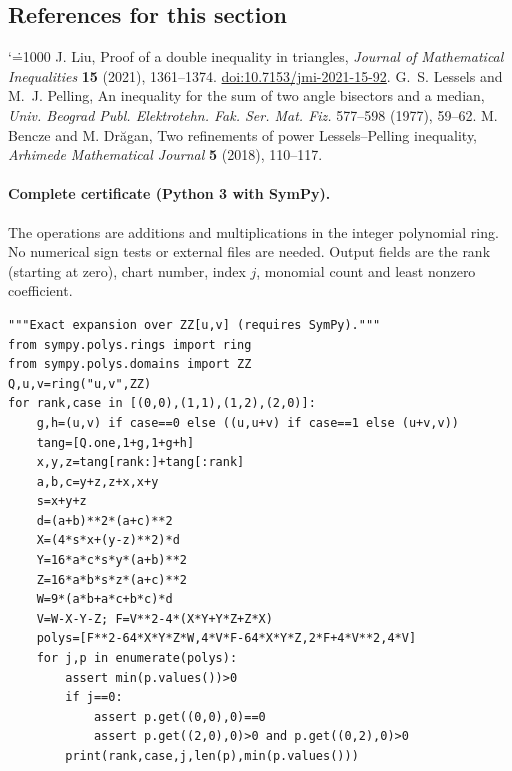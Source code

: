\documentclass[11pt,a4paper]{article}
\makeatletter
\numberwithin{equation}{section}
\theoremstyle{definition}
\theoremstyle{remark}
\renewenvironment{thebibliography}[1]
 {\subsection*{References for this section}\small
  \list{\@biblabel{\@arabic\c@enumiv}}
       {\settowidth\labelwidth{\@biblabel{#1}}\leftmargin\labelwidth
        \advance\leftmargin\labelsep\@openbib@code
        \usecounter{enumiv}\let\p@enumiv\@empty
        \renewcommand\theenumiv{\@arabic\c@enumiv}}
  \sloppy\clubpenalty4000\widowpenalty4000\sfcode`\.=1000\relax}
 {\def\@noitemerr{\@latex@warning{Empty bibliography}}\endlist}
\makeatother
\begin{document}
\begin{thebibliography}{9}
 J. Liu, Proof of a double inequality in triangles, \emph{Journal of Mathematical Inequalities} \textbf{15} (2021), 1361--1374. \href{https://doi.org/10.7153/jmi-2021-15-92}{doi:10.7153/jmi-2021-15-92}.
 G.~S. Lessels and M.~J. Pelling, An inequality for the sum of two angle bisectors and a median, \emph{Univ. Beograd Publ. Elektrotehn. Fak. Ser. Mat. Fiz.} 577--598 (1977), 59--62.
 M. Bencze and M. Dr\u{a}gan, Two refinements of power Lessels--Pelling inequality, \emph{Arhimede Mathematical Journal} \textbf{5} (2018), 110--117.
\end{thebibliography}

\paragraph{Complete certificate (Python 3 with SymPy).}
The operations are additions and multiplications in the integer polynomial ring. No numerical sign tests or external files are needed. Output fields are the rank (starting at zero), chart number, index $j$, monomial count and least nonzero coefficient.
\begingroup\fontsize{8}{9.7}\selectfont
\begin{Verbatim}
"""Exact expansion over ZZ[u,v] (requires SymPy)."""
from sympy.polys.rings import ring
from sympy.polys.domains import ZZ
Q,u,v=ring("u,v",ZZ)
for rank,case in [(0,0),(1,1),(1,2),(2,0)]:
    g,h=(u,v) if case==0 else ((u,u+v) if case==1 else (u+v,v))
    tang=[Q.one,1+g,1+g+h]
    x,y,z=tang[rank:]+tang[:rank]
    a,b,c=y+z,z+x,x+y
    s=x+y+z
    d=(a+b)**2*(a+c)**2
    X=(4*s*x+(y-z)**2)*d
    Y=16*a*c*s*y*(a+b)**2
    Z=16*a*b*s*z*(a+c)**2
    W=9*(a*b+a*c+b*c)*d
    V=W-X-Y-Z; F=V**2-4*(X*Y+Y*Z+Z*X)
    polys=[F**2-64*X*Y*Z*W,4*V*F-64*X*Y*Z,2*F+4*V**2,4*V]
    for j,p in enumerate(polys):
        assert min(p.values())>0
        if j==0:
            assert p.get((0,0),0)==0
            assert p.get((2,0),0)>0 and p.get((0,2),0)>0
        print(rank,case,j,len(p),min(p.values()))
\end{Verbatim}
\endgroup

\par\endgroup

\begingroup
\newcommand{\E}{\mathbb E}
\newcommand{\PP}{\mathbb P}
\end{document}
